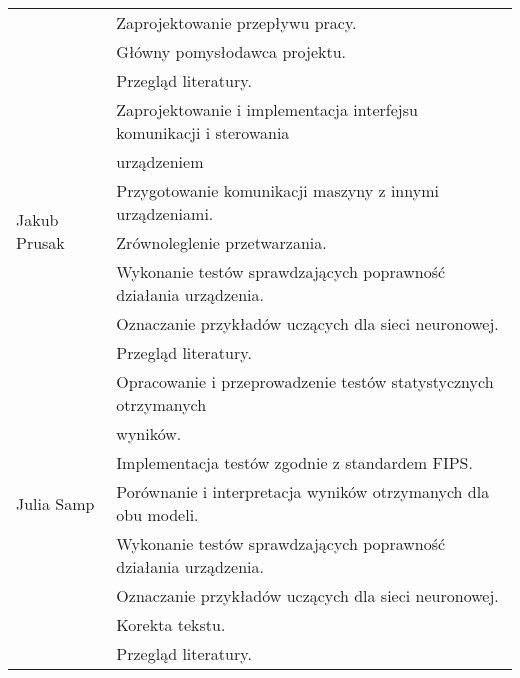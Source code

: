 \begin{table} [H]
\begin{tabular}{|l|l|}
            & Zaprojektowanie przepływu pracy. \\
            & Główny pomysłodawca projektu. \\
            & Przegląd literatury. \\
        \hline
        \multirow{7}{*}{Jakub Prusak} 
            & Zaprojektowanie i implementacja interfejsu komunikacji i sterowania \\
            & urządzeniem\\
            & Przygotowanie komunikacji maszyny z innymi urządzeniami. \\
            & Zrównoleglenie przetwarzania. \\
            & Wykonanie testów sprawdzających poprawność działania urządzenia. \\
            & Oznaczanie przykładów uczących dla sieci neuronowej. \\
            & Przegląd literatury. \\
        \hline
        \multirow{7}{*}{Julia Samp} 
            & Opracowanie i przeprowadzenie testów statystycznych otrzymanych \\
            & wyników. \\
            & Implementacja testów zgodnie z standardem FIPS. \\
            & Porównanie i interpretacja wyników otrzymanych dla obu modeli. \\
            & Wykonanie testów sprawdzających poprawność działania urządzenia. \\
            & Oznaczanie przykładów uczących dla sieci neuronowej. \\
            & Korekta tekstu. \\
            & Przegląd literatury. \\
        \hline  
    \end{tabular} 
\end{table}   



